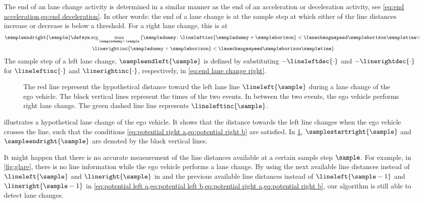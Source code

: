 The end of an lane change activity is determined in a similar manner as the end of an acceleration or deceleration activity, see \cref{eq:end acceleration,eq:end deceleration}.
In other words: the end of a lane change is at the sample step at which either of the line distances increase or decrease is below a threshold. For a right lane change, this is at
\begin{multline}
	\label{eq:end lane change right}
	\sampleendright{\sample} \defsym \arg \max_{\sampledummy > \sample} \left\{ \sampledummy\colon \lineleftinc{\sampledummy+\samplehorizon}<\lanechangespeed\samplehorizon\sampletime \lor \right.\\
	\left. \linerightinc{\sampledummy+\samplehorizon}< \lanechangespeed\samplehorizon\sampletime \right\}
\end{multline}
The sample step of a left lane change, $\sampleendleft{\sample}$ is defined by substituting $-\lineleftdec{\cdot}$ and $-\linerightdec{\cdot}$ for $\lineleftinc{\cdot}$ and $\linerightinc{\cdot}$, respectively, in \cref{eq:end lane change right}.
\cenda

\setlength{\figurewidth}{\linewidth}
\setlength{\figureheight}{0.6\linewidth}
\begin{figure}
	\centering
	
	\caption{\cstarta The red line represent the hypothetical distance toward the left lane line $\lineleft{\sample}$ during a lane change of the ego vehicle. The black vertical lines represent the times of the two events. In between the two events, the ego vehicle performs right lane change. The green dashed line line represents $\lineleftinc{\sample}$.\cenda}
	\label{fig:ego lane change}
\end{figure}

\cstarta
{} illustrates a hypothetical lane change of the ego vehicle. It shows that the distance towards the left line changes when the ego vehicle crosses the line, such that the conditions \cref{eq:potential right a,eq:potential right b} are satisfied. In \cref{fig:ego lane change}, $\samplestartright{\sample}$ and $\sampleendright{\sample}$ are denoted by the black vertical lines.

\begin{remark}
	It might happen that there is no accurate measurement of the line distances available at a certain sample step $\sample$. For example, in \cref{fig:glare}, there is no line information while the ego vehicle performs a lane change. By using the next available line distances instead of $\lineleft{\sample}$ and $\lineright{\sample}$ in and the previous available line distances instead of $\lineleft{\sample-1}$ and $\lineright{\sample-1}$ in \cref{eq:potential left a,eq:potential left b,eq:potential right a,eq:potential right b}, our algorithm is still able to detect lane changes.
\end{remark}
\cenda

